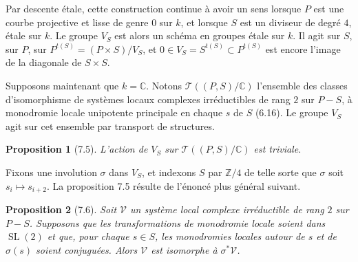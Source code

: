 \documentclass[10pt]{article}
\newcommand{\C}{\mathbb C}
\newcommand{\Z}{\mathbb Z}
\newcommand{\SL}{\operatorname{SL}}
\theoremstyle{deligne}
\newtheorem*{proposition*}{Proposition}
\newcommand{\heading}[1]{\vspace{0.7em}\noindent{\bfseries #1}\quad}
\begin{document}
Par descente \'{e}tale, cette construction continue à avoir un sens lorsque $P$ est une courbe projective et lisse de genre $0$ sur $k$, et lorsque $S$ est un diviseur de degré $4$, \'{e}tale sur $k$. Le groupe $V_S$ est alors un schéma en groupes \'{e}tale sur $k$. Il agit sur $S$, sur $P$, sur $P^{t(S)}=(P\times S)/V_S$, et $0\in V_S=S^{t(S)}\subset P^{t(S)}$ est encore l'image de la diagonale de $S\times S$.

\heading{7.4.} Supposons maintenant que $k=\C$. Notons $\mathcal T((P,S)/\C)$ l'ensemble des classes d'isomorphisme de systèmes locaux complexes irréductibles de rang $2$ sur $P-S$, à monodromie locale unipotente principale en chaque $s$ de $S$ (6.16). Le groupe $V_S$ agit sur cet ensemble par transport de structures.

\begin{proposition*}[7.5]
L'action de $V_S$ sur $\mathcal T((P,S)/\C)$ est triviale.
\end{proposition*}

Fixons une involution $\sigma$ dans $V_S$, et indexons $S$ par $\Z/4$ de telle sorte que $\sigma$ soit $s_i\mapsto s_{i+2}$. La proposition 7.5 résulte de l'énoncé plus général suivant.

\begin{proposition*}[7.6]
Soit $\mathcal V$ un système local complexe irréductible de rang $2$ sur $P-S$. Supposons que les transformations de monodromie locale soient dans $\SL(2)$ et que, pour chaque $s\in S$, les monodromies locales autour de $s$ et de $\sigma(s)$ soient conjuguées. Alors $\mathcal V$ est isomorphe à $\sigma^*\mathcal V$.
\end{proposition*}
\end{document}
